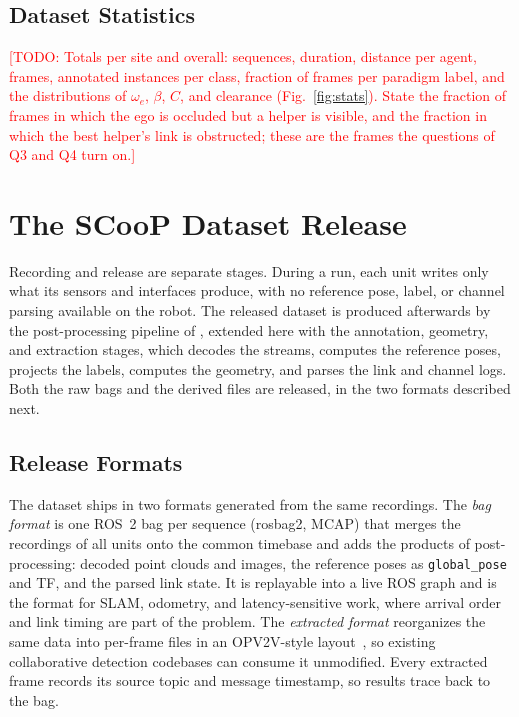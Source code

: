 \documentclass[journal]{IEEEtran}
\newcommand{\todo}[1]{\textcolor{red}{[TODO: #1]}}
\begin{document}


\subsection{Dataset Statistics}
\label{sec:stats}
\todo{Totals per site and overall: sequences, duration, distance per
agent, frames, annotated instances per class, fraction of frames per
paradigm label, and the distributions of $\omega_e$, $\beta$, $C$, and
clearance (Fig.~\ref{fig:stats}). State the fraction of frames in
which the ego is occluded but a helper is visible, and the fraction in
which the best helper's link is obstructed; these are the frames the
questions of Q3 and Q4 turn on.}



\section{The SCooP Dataset Release}
\label{sec:format}
Recording and release are separate stages. During a run, each unit
writes only what its sensors and interfaces produce, with no
reference pose, label, or channel parsing available on the robot.
The released dataset is produced afterwards by the post-processing
pipeline of \cite{scoop_testbed}, extended here with the annotation,
geometry, and extraction stages, which decodes the streams, computes
the reference poses, projects the labels, computes the geometry, and
parses the link and channel logs. Both the raw bags and the derived
files are released, in the two formats described next.

\subsection{Release Formats}
The dataset ships in two formats generated from the same recordings.
The \emph{bag format} is one ROS~2 bag per sequence (rosbag2, MCAP)
that merges the recordings of all units onto the common timebase and
adds the products of post-processing: decoded point clouds and
images, the reference poses as \texttt{global\_pose} and TF, and the
parsed link state. It is replayable into a live ROS graph and is the
format for SLAM, odometry, and latency-sensitive work, where arrival
order and link timing are part of the problem. The \emph{extracted
format} reorganizes the same data into per-frame files in an
OPV2V-style layout~\cite{opv2v}, so existing collaborative detection
codebases can consume it unmodified. Every extracted frame records
its source topic and message timestamp, so results trace back to the
bag.
\end{document}
